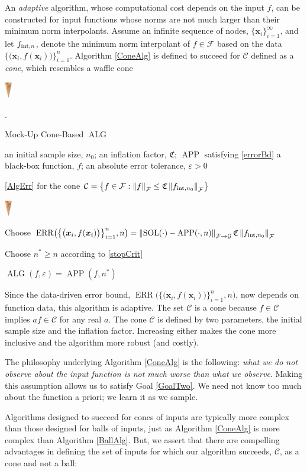 \documentclass[11pt]{NSFamsart}
\DeclareMathOperator{\SOL}{SOL}
\DeclareMathOperator{\APP}{APP}
\DeclareMathOperator{\ALG}{ALG}
\DeclareMathOperator{\ERR}{ERR}
\newcommand{\bx}{{\boldsymbol{x}}}
\newcommand{\cc}{\mathcal{C}}
\newcommand{\calc}{{\mathcal{C}}}
\newcommand{\calf}{{\mathcal{F}}}
\newcommand{\calg}{{\mathcal{G}}}
\newcommand{\fC}{\mathfrak{C}}
\newcommand{\norm}[2][{}]{\ensuremath{\left \lVert #2 \right \rVert}_{#1}}
\newcommand{\designInf}{\{\bx_i\}_{i=1}^\infty}
\newcommand{\dataN}{\bigl\{\bigl(\bx_i,f(\bx_i)\bigr)\bigr\}_{i=1}^n}
\newcommand{\ErrN}{\ERR\bigl(\dataN,n\bigr)}
\newcommand{\inflate}{\fC}
\newcommand{\smallcone}{\parbox{0.7cm}{\includegraphics[width=0.32cm,angle=270]{ProgramsImages/MediumWaffleCone.eps}}\xspace}
\begin{document}
An \emph{adaptive} algorithm, whose computational cost depends on the input $f$, can be constructed for input functions whose norms are not much larger than their minimum norm interpolants.  Assume an infinite sequence of nodes, $\designInf$, and let $f_{\textup{int},n}$, denote the minimum norm interpolant of $f \in \calf$ based on the data $\dataN$.  Algorithm \ref{ConeAlg} is defined to succeed for $\calc$ defined as a \emph{cone}, which resembles a waffle cone \smallcone.

\begin{algorithm}
	\caption{Mock-Up Cone-Based $\ALG$ \label{ConeAlg}} 
	\begin{algorithmic}
	\PARAM an initial sample size, $n_0$; an inflation factor, $\fC$; $\APP$ satisfying \eqref{errorBd}
		\INPUT a black-box function, $f$; an absolute error tolerance,
		$\varepsilon>0$

\Ensure \eqref{AlgErr} for  the cone $\cc = \bigl\{f \in \calf : \norm[\calf]{f} \le \inflate \norm[\calf]{f_{\textup{int},n_0}} \bigr \}$\smallcone

\State Choose $\ErrN = \norm[\calf \to \calg]{\SOL(\cdot) - \APP(\cdot,n)} \inflate \norm[\calf]{f_{\textup{int},n_0}}$ \\ 

\State Choose $n^* \ge n$ according to \eqref{stopCrit}

\RETURN $\ALG(f,\varepsilon) = \APP(f,n^*)$
\end{algorithmic}
\end{algorithm}

Since the data-driven error bound, $\ErrN$, now depends on function data, this algorithm is adaptive.  The set $\calc$ is a cone because $f \in \calc$ implies $a f \in \calc$ for any real $a$.  The cone $\calc$ is defined by two parameters, the initial sample size and the inflation factor.  Increasing either makes the cone more inclusive and the algorithm more robust (and costly).  

The philosophy underlying Algorithm \ref{ConeAlg} is the following: \emph{what we do not observe about the input function is not much worse than what we observe}.  Making this assumption allows us to satisfy Goal \ref{GoalTwo}.  We need not know too much about the function a priori; we learn it as we sample.

Algorithms designed to succeed for cones of inputs are typically more complex than those designed for balls of inputs, just as Algorithm \ref{ConeAlg} is more complex than Algorithm \ref{BallAlg}.  But, we assert that there are compelling advantages in defining the set of inputs for which our algorithm succeeds, $\calc$, as a cone and not a ball:
\end{document}

